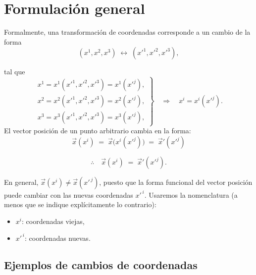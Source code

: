 \documentclass[../apunte_mecanica_clasica.tex]{subfiles}%
\begin{document}
\newpage

\section{Formulación general}

Formalmente, una transformación de coordenadas corresponde a un cambio de la forma
\begin{equation*}
    (x^{1},x^{2},x^{3}) \;\longleftrightarrow\; (x'^{1},x'^{2},x'^{3}),
\end{equation*}

tal que
\begin{equation*}
    \left. \begin{aligned}
        x^{1}=x^{1}(x'^{1},x'^{2},x'^{3})=x^{1}(x'^{j}),\\[6pt]
        x^{2}=x^{2}(x'^{1},x'^{2},x'^{3})=x^{2}(x'^{j}),\\[6pt]
        x^{3}=x^{3}(x'^{1},x'^{2},x'^{3})=x^{3}(x'^{j}),
    \end{aligned}
    \right\} \quad \Rightarrow \quad x^{i}=x^{i}(x'^{j}).
\end{equation*}
El vector posición de un punto arbitrario cambia en la forma:
\begin{equation*}
    \vec{x}(x^{i}) \;=\; \vec{x}\!\big(x^{i}(x'^{j})\big) \;=\; \vec{x}'(x'^{j})
\end{equation*}

\begin{equation*}
    \therefore\quad\vec{x}(x^{i}) \;=\; \vec{x}'(x'^{j}).
\end{equation*}

En general, $\vec{x}(x^{i}) \neq \vec{x}(x'^{\,j})$, puesto que la forma funcional del vector posición puede cambiar con las nuevas coordenadas $x'^{\,i}$. Usaremos la nomenclatura (a menos que se indique explícitamente lo contrario):
\begin{itemize}
    \item $x^{i}$: coordenadas viejas,
    \item $x'^{\,i}$: coordenadas nuevas.
\end{itemize}


\subsection{Ejemplos de cambios de coordenadas}
\end{document}

